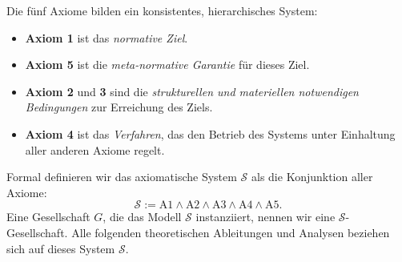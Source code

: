 Die fünf Axiome bilden ein konsistentes, hierarchisches System:
\begin{itemize}
    \item \textbf{Axiom 1} ist das \emph{normative Ziel}.
    \item \textbf{Axiom 5} ist die \emph{meta-normative Garantie} für dieses Ziel.
    \item \textbf{Axiom 2} und \textbf{3} sind die \emph{strukturellen und materiellen notwendigen Bedingungen} zur Erreichung des Ziels.
    \item \textbf{Axiom 4} ist das \emph{Verfahren}, das den Betrieb des Systems unter Einhaltung aller anderen Axiome regelt.
\end{itemize}

Formal definieren wir das axiomatische System $\mathcal{S}$ als die Konjunktion aller Axiome:
\[
\boxed{\mathcal{S} := \text{A1} \land \text{A2} \land \text{A3} \land \text{A4} \land \text{A5}.}
\]
Eine Gesellschaft $G$, die das Modell $\mathcal{S}$ instanziiert, nennen wir eine $\mathcal{S}$-Gesellschaft. Alle folgenden theoretischen Ableitungen und Analysen beziehen sich auf dieses System $\mathcal{S}$.
